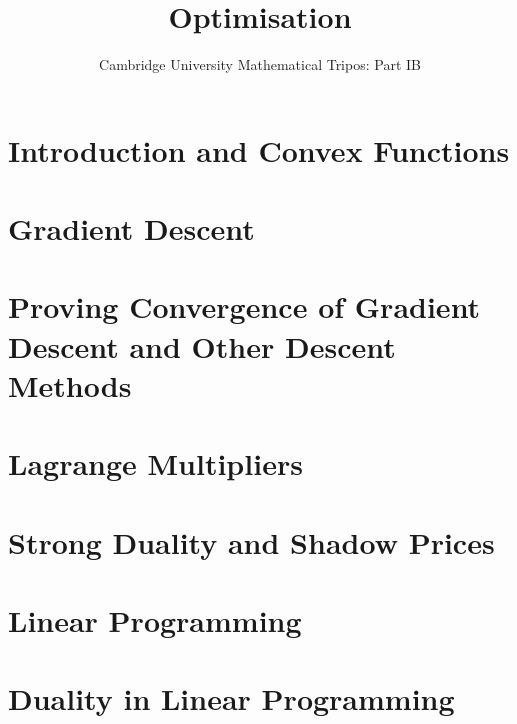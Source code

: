 \documentclass{article}
\title{Optimisation}
\author{Cambridge University Mathematical Tripos: Part IB}
\begin{document}
\maketitle

\tableofcontentsnewpage{}

\section{Introduction and Convex Functions}

\section{Gradient Descent}

\section{Proving Convergence of Gradient Descent and Other Descent Methods}

\section{Lagrange Multipliers}

\section{Strong Duality and Shadow Prices}

\section{Linear Programming}

\section{Duality in Linear Programming}

\end{document}
